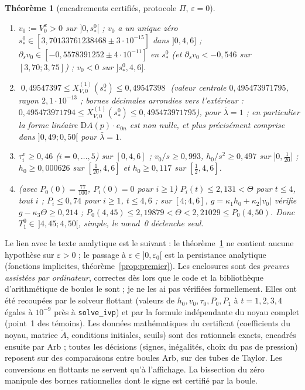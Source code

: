 \documentclass[11pt,a4paper]{article}
\newtheorem{theoreme}{Théorème}
\theoremstyle{remark}
\newcommand{\D}{\mathrm D}
\begin{document}
\begin{theoreme}[encadrements certifiés, protocole $\Pi$, $\varepsilon=0$]\label{thm:certif}
\begin{enumerate}[nosep]
\item $v_0:=V_0^x>0$ sur $]0,s_*^0[$ ; $v_0$ a un unique zéro $s_*^0\in[3{,}70133761238468\pm3\cdot10^{-15}]$ dans $]0,4{,}6]$ ; $\partial_sv_0\in[-0{,}5578391252\pm4\cdot10^{-11}]$ en $s_*^0$ (et $\partial_sv_0<-0{,}546$ sur $[3{,}70;3{,}75]$) ; $v_0<0$ sur $]s_*^0,4{,}6]$.
\item $\boxed{\;0{,}49547397\le X^{(1)}_{V,0}(s_*^0)\le0{,}49547398\;}$ (valeur centrale $0{,}495473971795$, rayon $2{,}1\cdot10^{-13}$ ; bornes décimales arrondies vers l'extérieur : $0{,}495473971794\le X^{(1)}_{V,0}(s_*^0)\le0{,}495473971795$), pour $\bar\lambda=1$ ; en particulier la forme linéaire $\D A(p)\cdot e_{0n}$ est non nulle, et plus précisément comprise dans $]0{,}49;0{,}50[$ pour $\bar\lambda=1$.
\item $\tau_i^x\ge0{,}46$ ($i=0,\dots,5$) sur $[0,4{,}6]$ ; $v_0/s\ge0{,}993$, $h_0/s^2\ge0{,}497$ sur $]0,\frac1{20}]$ ; $h_0\ge0{,}000626$ sur $[\frac1{20},4{,}6]$ et $h_0\ge0{,}117$ sur $[\frac12,4{,}6]$.
\item (avec $P_0(0)=\frac{77}{100}$, $P_i(0)=0$ pour $i\ge1$) $P_i(t)\le2{,}131<\Theta$ pour $t\le4$, tout $i$ ; $P_i\le0{,}74$ pour $i\ge1$, $t\le4{,}6$ ; sur $[4;4{,}6]$, $g=\kappa_1h_0+\kappa_2\lvert v_0\rvert$ vérifie $g-\kappa_3\Theta\ge0{,}214$ ; $P_0(4{,}45)\le2{,}19879<\Theta<2{,}21029\le P_0(4{,}50)$. Donc $T_1^0\in\,]4{,}45;4{,}50[$, simple, le nœud~0 déclenche seul.
\end{enumerate}
\end{theoreme}
Le lien avec le texte analytique est le suivant : le théorème~\ref{thm:certif} ne contient aucune hypothèse sur $\varepsilon>0$ ; le passage à $\varepsilon\in]0,\varepsilon_0[$ est la persistance analytique (fonctions implicites, théorème~\ref{prop:premier}). Les enclosures sont des \emph{preuves assistées par ordinateur}, correctes dès lors que le code et la bibliothèque d'arithmétique de boules le sont ; je ne les ai pas vérifiées formellement. Elles ont été recoupées par le solveur flottant (valeurs de $h_0,v_0,\tau_0,P_0,P_1$ à $t=1,2,3,4$ égales à $10^{-9}$ près à \texttt{solve\_ivp}) et par la formule indépendante du noyau complet (point~1 des témoins). Les données mathématiques du certificat (coefficients du noyau, matrice $\widetilde A$, conditions initiales, seuils) sont des rationnels exacts, encadrés ensuite par Arb ; toutes les décisions (signes, inégalités, choix du pas de pression) reposent sur des comparaisons entre boules Arb, sur des tubes de Taylor. Les conversions en flottants ne servent qu'à l'affichage. La bissection du zéro manipule des bornes rationnelles dont le signe est certifié par la boule.
\end{document}
